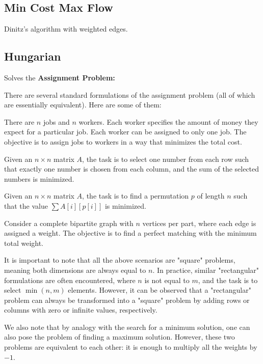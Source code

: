 	\subsection{Min Cost Max Flow}

		Dinitz's algorithm with weighted edges.


	\subsection{Hungarian}

		Solves the \textbf{Assignment Problem:}

		There are several standard formulations of the assignment problem (all of which are essentially equivalent). Here are some of them:

		There are $n$ jobs and $n$ workers. Each worker specifies the amount of money they expect for a particular job.
		Each worker can be assigned to only one job. The objective is to assign jobs to workers in a way that minimizes the total cost.

		Given an $n \times n$ matrix $A$, the task is to select one number from each row such that exactly 
		one number is chosen from each column, and the sum of the selected numbers is minimized.

		Given an $n \times n$ matrix $A$, the task is to find a permutation $p$ of length $n$ such that the value
		$\sum A[i]\left[p[i]\right]$ is minimized.

		Consider a complete bipartite graph with $n$ vertices per part, where each edge is assigned a weight.
		The objective is to find a perfect matching with the minimum total weight.

		It is important to note that all the above scenarios are "square" problems, meaning both dimensions are always equal to
		$n$. In practice, similar "rectangular" formulations are often encountered, where $n$ is not equal to 
		$m$, and the task is to select $\min(n,m)$ elements. However, it can be observed that a "rectangular" 
		problem can always be transformed into a "square" problem by adding rows or columns with zero or infinite values, respectively.

		We also note that by analogy with the search for a minimum solution, one can also pose the problem of finding a maximum solution. 
		However, these two problems are equivalent to each other: it is enough to multiply all the weights by $-1$.

	
